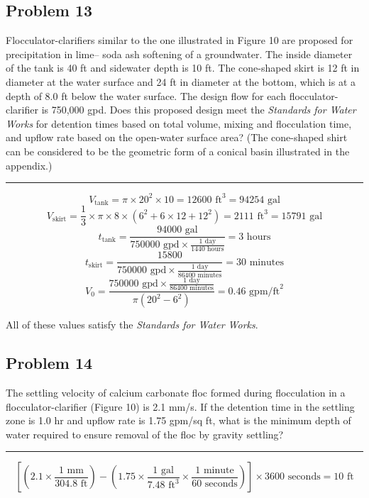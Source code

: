 \subsection*{Problem 13}
Flocculator-clarifiers similar to the one illustrated in Figure 10 are proposed for precipitation in lime– soda ash softening of a groundwater. The inside diameter of the tank is 40 ft and sidewater depth is 10 ft. The cone-shaped skirt is 12 ft in diameter at the water surface and 24 ft in diameter at the bottom, which is at a depth of 8.0 ft below the water surface. The design flow for each flocculator-clarifier is 750,000 gpd. Does this proposed design meet the \textit{Standards for Water Works} for detention times based on total volume, mixing and flocculation time, and upflow rate based on the open-water surface area? (The cone-shaped shirt can be considered to be the geometric form of a conical basin illustrated in the appendix.)
\\\rule{5cm}{1pt}
\[V_\text{tank}=\pi\times20^2\times10=12600\text{ ft}^3=94254\text{ gal}\]
\[V_\text{skirt}=\frac{1}{3}\times\pi\times8\times(6^2+6\times12+12^2)=2111\text{ ft}^3=15791\text{ gal}\]
\[t_\text{tank}=\frac{94000\text{ gal}}{750000\text{ gpd}\times\frac{1 \text{ day}}{1440 \text{ hours}}}=3\text{ hours}\]
\[t_\text{skirt}=\frac{15800}{750000\text{ gpd}\times\frac{1 \text{ day}}{86400 \text{ minutes}}}=30 \text{ minutes}\]
\[V_0=\frac{750000\text{ gpd}\times\frac{1 \text{ day}}{86400 \text{ minutes}}}{\pi(20^2-6^2)}=0.46\text{ gpm/ft}^2\]
\begin{center}
    All of these values satisfy the \textit{Standards for Water Works}.
\end{center}
\subsection*{Problem 14}
The settling velocity of calcium carbonate floc formed during flocculation in a flocculator-clarifier (Figure 10) is 2.1 mm/s. If the detention time in the settling zone is 1.0 hr and upflow rate is 1.75 gpm/sq ft, what is the minimum depth of water required to ensure removal of the floc by gravity settling?
\\\rule{5cm}{1pt}
\[\left[\left(2.1\times\frac{1 \text{ mm}}{304.8 \text{ ft}}\right)-\left(1.75\times\frac{1 \text{ gal}}{7.48 \text{ ft}^3}\times\frac{1 \text{ minute}}{60\text{ seconds}}\right)\right]\times3600\text{ seconds}=\boxed{10\text{ ft}}\]
